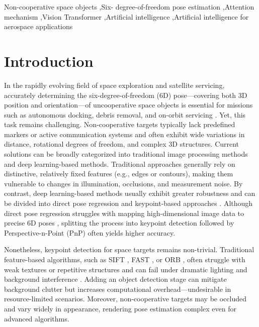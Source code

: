 \documentclass[a4paper,fleqn]{cas-sc}
\begin{document}
\begin{keywords}
Non-cooperative space objects \sep Six-
degree-of-freedom pose estimation
\sep Attention mechanism
\sep Vision Transformer
\sep Artificial intelligence
\sep Artificial intelligence for aerospace applications
\end{keywords}

\maketitle 

\section{Introduction}
In the rapidly evolving field of space exploration and satellite servicing, accurately determining the six-degree-of-freedom (6D) pose—covering both 3D position and orientation—of uncooperative space objects is essential for missions such as autonomous docking, debris removal, and on-orbit servicing \citep{d2014pose,modelbased_algorithm,capuano2019robust}. Yet, this task remains challenging. Non-cooperative targets typically lack predefined markers or active communication systems and often exhibit wide variations in distance, rotational degrees of freedom, and complex 3D structures. Current solutions can be broadly categorized into traditional image processing methods and deep learning-based methods. Traditional approaches generally rely on distinctive, relatively fixed features (e.g., edges or contours), making them vulnerable to changes in illumination, occlusions, and measurement noise. By contrast, deep learning-based methods usually exhibit greater robustness and can be divided into direct pose regression and keypoint-based approaches \citep{huan2020pose,park2019towards,wang2022revisiting}. Although direct pose regression struggles with mapping high-dimensional image data to precise 6D poses \citep{sharma2018pose,sharma2019pose}, splitting the process into keypoint detection followed by Perspective-n-Point (PnP) often yields higher accuracy.

Nonetheless, keypoint detection for space targets remains non-trivial. Traditional feature-based algorithms, such as SIFT \citep{sift}, FAST \citep{fast}, or ORB \citep{orb}, often struggle with weak textures or repetitive structures and can fail under dramatic lighting and background interference \citep{Dai2019Comparison,bojanic2019comparison}. Adding an object detection stage \citep{chen2019satellite,park2019towards,black2021real,wang2022revisiting} can mitigate background clutter but increases computational overhead—undesirable in resource-limited scenarios. Moreover, non-cooperative targets may be occluded and vary widely in appearance, rendering pose estimation complex even for advanced algorithms. 
\end{document}
